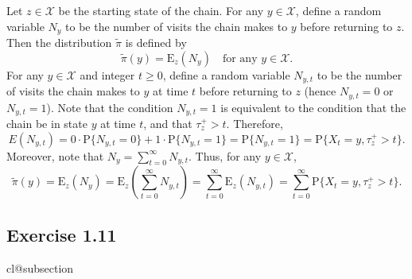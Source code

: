 \documentclass[12pt]{article}
\makeatletter
\def\nullstepcounter#1{%
	\begingroup
		\let\@elt\@stpelt
		\csname cl@#1\endcsname
	\endgroup}
\newcommand{\E}{\mathrm{E}}
\newcommand{\Prob}{\mathrm{P}}
\makeatother
\begin{document}
Let $z \in \mathcal{X}$ be the starting state of the chain. For any $y \in \mathcal{X}$, define a random variable $N_y$ to be the number of visits the chain makes to $y$ before returning to $z$. Then the distribution $\tilde{\pi}$ is defined by
\begin{equation*}
\tilde{\pi}(y) = \E_z(N_y) \quad \text{for any $y \in \mathcal{X}$}.
\end{equation*}
For any $y \in \mathcal{X}$ and integer $t \geq 0$, define a random variable $N_{y,t}$ to be the number of visits the chain makes to $y$ at time $t$ before returning to $z$ (hence $N_{y,t} = 0$ or $N_{y,t} = 1$). Note that the condition $N_{y,t} = 1$ is equivalent to the condition that the chain be in state $y$ at time $t$, and that $\tau_z^+ > t$. Therefore,
\begin{equation*}
E(N_{y,t}) = 0 \cdot \Prob \{N_{y,t} = 0\} + 1 \cdot \Prob \{N_{y,t} = 1\} = \Prob \{N_{y,t} = 1\} = \Prob \{X_t = y, \tau_z^+ > t\}.
\end{equation*}
Moreover, note that $N_y = \sum_{t=0}^\infty N_{y,t}$. Thus, for any $y \in \mathcal{X}$,
\begin{equation*}
\tilde{\pi}(y) = \E_z(N_y) = \E_z\left(\sum_{t=0}^\infty N_{y,t}\right) = \sum_{t=0}^\infty \E_z(N_{y,t}) = \sum_{t=0}^\infty \Prob \{X_t = y, \tau_z^+ > t\}.
\end{equation*}

\subsection*{Exercise 1.11}
\nullstepcounter{subsection}
\end{document}
